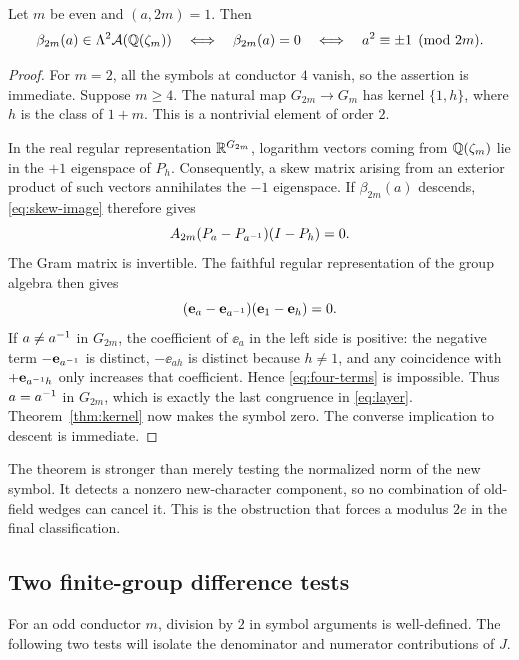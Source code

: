 \begin{theorem}\label{thm:layer}
Let $m$ be even and $(a,2m)=1$. Then
\begin{equation}\label{eq:layer}
 \beta_{2m}(a)\in\Lambda^2\mathcal A(\mathbb Q(\zeta_m))
 \quad\Longleftrightarrow\quad
 \beta_{2m}(a)=0
 \quad\Longleftrightarrow\quad
 a^2\equiv\pm1\pmod{2m}.
\end{equation}
\end{theorem}
\begin{proof}
For $m=2$, all the symbols at conductor $4$ vanish, so the assertion
is immediate. Suppose $m\ge4$. The natural map
$G_{2m}\to G_m$ has kernel $\{1,h\}$, where $h$ is the class of
$1+m$. This is a nontrivial element of order $2$.

In the real regular representation $\mathbb R^{G_{2m}}$, logarithm vectors
coming from $\mathbb Q(\zeta_m)$ lie in the $+1$ eigenspace of $P_h$.
Consequently, a skew matrix arising from an exterior product of such
vectors annihilates the $-1$ eigenspace. If $\beta_{2m}(a)$ descends,
\eqref{eq:skew-image} therefore gives
\[
 A_{2m}(P_a-P_{a^{-1}})(I-P_h)=0.
\]
The Gram matrix is invertible. The faithful regular representation of
the group algebra then gives
\begin{equation}\label{eq:four-terms}
 (\mathbf e_a-\mathbf e_{a^{-1}})(\mathbf e_1-\mathbf e_h)=0.
\end{equation}
If $a\ne a^{-1}$ in $G_{2m}$, the coefficient of $\ee_a$ in the left
side is positive: the negative term $-\mathbf e_{a^{-1}}$ is distinct,
$-\ee_{ah}$ is distinct because $h\ne1$, and any coincidence with
$+\mathbf e_{a^{-1} h}$ only increases that coefficient. Hence
\eqref{eq:four-terms} is impossible. Thus $a=a^{-1}$ in $G_{2m}$,
which is exactly the last congruence in \eqref{eq:layer}.
Theorem~\ref{thm:kernel} now makes the symbol zero. The converse
implication to descent is immediate.
\end{proof}

The theorem is stronger than merely testing the normalized norm of the
new symbol. It detects a nonzero new-character component, so no
combination of old-field wedges can cancel it. This is the obstruction
that forces a modulus $2e$ in the final classification.

\subsection{Two finite-group difference tests}

For an odd conductor $m$, division by $2$ in symbol arguments is
well-defined. The following two tests will isolate the denominator and
numerator contributions of $J$.

